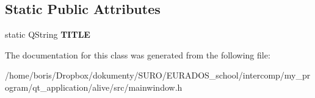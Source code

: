 \subsection*{Static Public Attributes}
\begin{DoxyCompactItemize}
\item 
\hypertarget{classMainWindow_aa26df84f6e0c27464332427cec49d8a9}{static Q\-String {\bfseries T\-I\-T\-L\-E}}\label{classMainWindow_aa26df84f6e0c27464332427cec49d8a9}

\end{DoxyCompactItemize}


The documentation for this class was generated from the following file\-:\begin{DoxyCompactItemize}
\item 
/home/boris/\-Dropbox/dokumenty/\-S\-U\-R\-O/\-E\-U\-R\-A\-D\-O\-S\-\_\-school/intercomp/my\-\_\-program/qt\-\_\-application/alive/src/mainwindow.\-h\end{DoxyCompactItemize}
